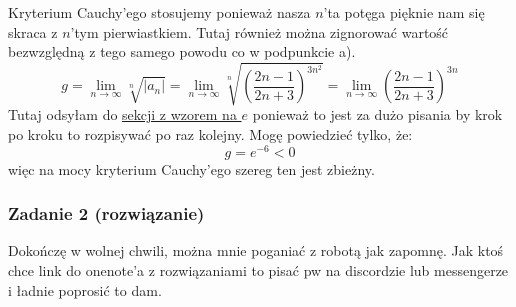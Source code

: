 \documentclass[11pt]{article}
\begin{document}
\begin{list}{}{}
{\[        \]
        Kryterium Cauchy'ego stosujemy ponieważ nasza $n$'ta potęga pięknie nam się skraca z 
        $n$'tym pierwiastkiem. Tutaj również można zignorować wartość bezwzględną z tego samego powodu
        co w podpunkcie a).
        \[
            g = \lim_{n\to\infty}{\sqrt[n]{\left\lvert a_n \right\rvert}} = 
            \lim_{n\to\infty}{\sqrt[n]{(\frac{2n - 1}{2n + 3})^{3n^2}}}
            = \lim_{n\to\infty}(\frac{2n - 1}{2n + 3})^{3n}
        \]
        Tutaj odsyłam do \hyperlink{subsection.2.2}{sekcji z wzorem na $e$} ponieważ to jest za dużo pisania by
        krok po kroku to rozpisywać po raz kolejny. Mogę powiedzieć tylko, że:
        \[
            g = e^{-6} < 0
        \]
        więc na mocy kryterium Cauchy'ego szereg ten jest zbieżny.
    }
\end{list}

\subsubsection{Zadanie 2 (rozwiązanie)}
Dokończę w wolnej chwili, można mnie poganiać z robotą jak zapomnę. Jak ktoś chce link do onenote'a z rozwiązaniami
to pisać pw na discordzie lub messengerze i ładnie poprosić to dam.
\end{document}
